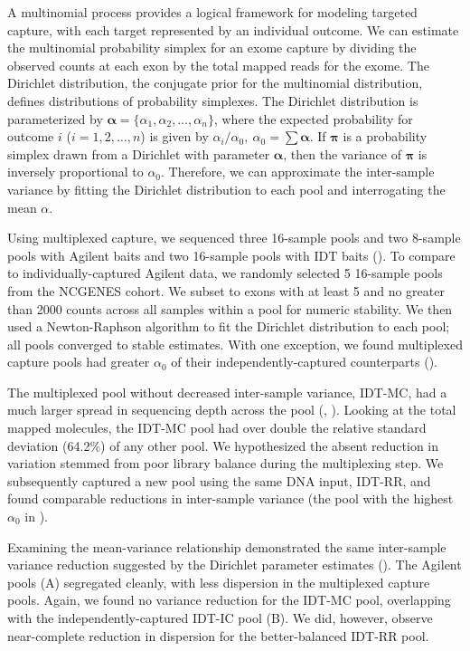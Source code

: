 \documentclass{bmcart}\usepackage[]{graphicx}\usepackage[]{color}
\begin{document}
A multinomial process provides a logical framework for modeling targeted capture, with each target represented by an individual outcome.
We can estimate the multinomial probability simplex for an exome capture by dividing the observed counts at each exon by the total mapped reads for the exome.
The Dirichlet distribution, the conjugate prior for the multinomial distribution, defines distributions of probability simplexes.
The Dirichlet distribution is parameterized by $\bm{\alpha} = \{\alpha_1, \alpha_2, \dots, \alpha_n\}$, where the expected probability for outcome $i$ ($i = 1, 2, \dots, n$) is given by $\alpha_i/\alpha_0,~\alpha_0 = \sum \bm\alpha$.
If $\bm\pi$ is a probability simplex drawn from a Dirichlet with parameter $\bm\alpha$, then the variance of $\bm\pi$ is inversely proportional to $\alpha_0$.
Therefore, we can approximate the inter-sample variance by fitting the Dirichlet distribution to each pool and interrogating the mean $\alpha$.

Using multiplexed capture, we sequenced three 16-sample pools and two 8-sample pools with Agilent baits and two 16-sample pools with IDT baits ().
To compare to individually-captured Agilent data, we randomly selected 5 16-sample pools from the NCGENES cohort.
We subset to exons with at least 5 and no greater than 2000 counts across all samples within a pool for numeric stability.
We then used a Newton-Raphson algorithm \cite{minka:2000aa} to fit the Dirichlet distribution to each pool; all pools converged to stable estimates.
With one exception, we found multiplexed capture pools had greater $\alpha_0$ of their independently-captured counterparts ().

The multiplexed pool without decreased inter-sample variance, IDT-MC, had a much larger spread in sequencing depth across the pool (, ).
Looking at the total mapped molecules, the IDT-MC pool had over double the relative standard deviation (64.2\%) of any other pool.
We hypothesized the absent reduction in variation stemmed from poor library balance during the multiplexing step.
We subsequently captured a new pool using the same DNA input, IDT-RR, and found comparable reductions in inter-sample variance (the pool with the highest $\alpha_0$ in ).

Examining the mean-variance relationship demonstrated the same inter-sample variance reduction suggested by the Dirichlet parameter estimates ().
The Agilent pools (A) segregated cleanly, with less dispersion in the multiplexed capture pools.
Again, we found no variance reduction for the IDT-MC pool, overlapping with the independently-captured IDT-IC pool (B).
We did, however, observe near-complete reduction in dispersion for the better-balanced IDT-RR pool.
\end{document}
